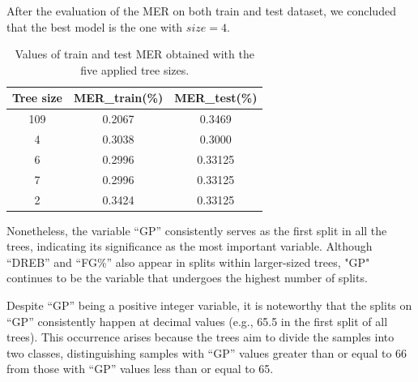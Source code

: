 After the evaluation of the MER on both train and test dataset, we concluded that the best model is the one with $size = 4$.

\begin{table}[H]
	\centering
	\begin{tabular}{|| c | c | c ||}
		\hline 
		Tree size & MER\_train(\%) & MER\_test(\%) \\
		\hline
		109 & 0.2067 & 0.3469 \\
		\hline
		4 & 0.3038 & 0.3000 \\
		\hline
		6 & 0.2996 & 0.33125 \\
		\hline
		7 & 0.2996 & 0.33125 \\
		\hline
		2 & 0.3424 & 0.33125 \\
		\hline
	\end{tabular}
	\caption{Values of train and test MER obtained with the five applied tree sizes.}
\end{table} 

Nonetheless, the variable ``GP'' consistently serves as the first split in all the trees, indicating its significance as the most important variable. Although ``DREB'' and ``FG\%'' also appear in splits within larger-sized trees, "GP" continues to be the variable that undergoes the highest number of splits.

Despite ``GP'' being a positive integer variable, it is noteworthy that the splits on ``GP'' consistently happen at decimal values (e.g., 65.5 in the first split of all trees). This occurrence arises because the trees aim to divide the samples into two classes, distinguishing samples with ``GP'' values greater than or equal to 66 from those with ``GP'' values less than or equal to 65.
